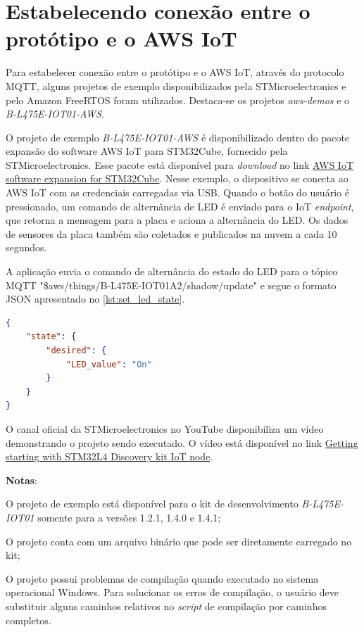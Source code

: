 \section{Estabelecendo conexão entre o protótipo e o AWS IoT}\label{section:estabelecendo_conexao_entre_o_prototipo_e_o_aws_iot}

Para estabelecer conexão entre o protótipo e o AWS IoT, através do protocolo MQTT, alguns projetos de exemplo disponibilizados pela STMicroelectronics e pelo Amazon FreeRTOS foram utilizados. Destaca-se os projetos \textit{aws-demos} e o \textit{B-L475E-IOT01-AWS}.

O projeto de exemplo \textit{B-L475E-IOT01-AWS} é disponibilizado dentro do pacote expansão do software AWS IoT para STM32Cube, fornecido pela STMicroelectronics. Esse pacote está disponível para \textit{download} no link \href{https://www.st.com/content/st_com/en/products/embedded-software/mcu-mpu-embedded-software/stm32-embedded-software/stm32cube-expansion-packages/x-cube-aws.html}{AWS IoT software expansion for STM32Cube}. Nesse exemplo, o dispositivo se conecta ao AWS IoT com as credenciais carregadas via USB. Quando o botão do usuário é pressionado, um comando de alternância de LED é enviado para o IoT \textit{endpoint}, que retorna a mensagem para a placa e aciona a alternância do LED. Os dados de sensores da placa também são coletados e publicados na nuvem a cada 10 segundos.

A aplicação envia o comando de alternância do estado do LED para o tópico MQTT "\$aws/things/B-L475E-IOT01A2/shadow/update" e segue o formato JSON apresentado no \autoref{lst:set_led_state}.

\begin{lstlisting}[float=htbp,language=json,firstnumber=1,caption={Formato da mensagem de alternância do estado do LED.},label=lst:set_led_state]
{
    "state": {
        "desired": {
            "LED_value": "On"
        }
    }
}
\end{lstlisting}

O canal oficial da STMicroelectronics no YouTube disponibiliza um vídeo demonstrando o projeto sendo executado. O vídeo está disponível no link \href{https://www.youtube.com/watch?v=6eUqxjBL_wI}{Getting starting with STM32L4 Discovery kit IoT node}.

\textbf{Notas}:
\begin{alineas}
    \item O projeto de exemplo está disponível para o kit de desenvolvimento \textit{B-L475E-IOT01} somente para a versões 1.2.1, 1.4.0 e 1.4.1;
    \item O projeto conta com um arquivo binário que pode ser diretamente carregado no kit;
    \item O projeto possui problemas de compilação quando executado no sistema operacional Windows. Para solucionar os erros de compilação, o usuário deve substituir alguns caminhos relativos no \textit{script} de compilação por caminhos completos.
\end{alineas}


